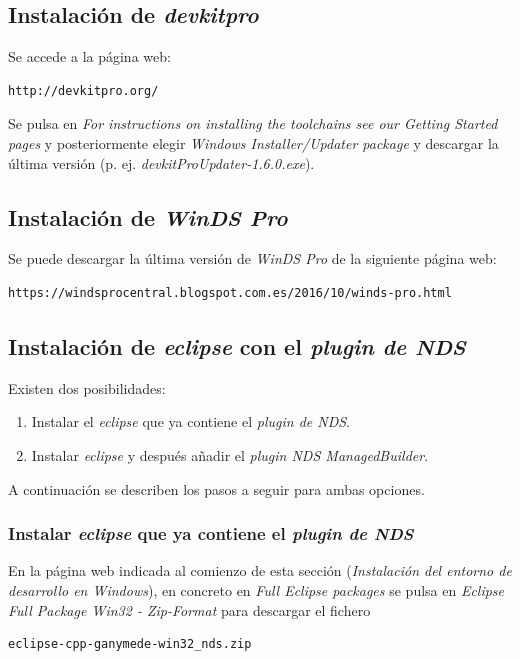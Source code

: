 \subsection{Instalación de \textit{devkitpro}}
Se accede a la página web:
\begin{verbatim}
http://devkitpro.org/
\end{verbatim}
Se pulsa en \textit{For instructions on installing the toolchains see our Getting Started pages} y posteriormente elegir \textit{Windows Installer/Updater package} y descargar la última versión (p. ej. \textit{devkitProUpdater-1.6.0.exe}). 
	
\subsection{Instalación de \textit{WinDS Pro}}
Se puede descargar la última versión de \textit{WinDS Pro} de la siguiente página web:
\begin{verbatim}
https://windsprocentral.blogspot.com.es/2016/10/winds-pro.html
\end{verbatim} 

\subsection{Instalación de \textit{eclipse} con el \textit{plugin de NDS}}
Existen dos posibilidades:
\begin{enumerate}
\item Instalar el \textit{eclipse} que ya contiene el \textit{plugin de NDS}.
\item Instalar \textit{eclipse} y después añadir el \textit{plugin NDS ManagedBuilder}.
\end{enumerate}

A continuación se describen los pasos a seguir para ambas opciones.

\subsubsection{Instalar \textit{eclipse} que ya contiene el \textit{plugin de NDS}}  
En la página web indicada al comienzo de esta sección (\textit{Instalación del entorno de desarrollo en Windows}), en concreto en \textit{Full Eclipse packages} se pulsa en \textit{Eclipse Full Package Win32 - Zip-Format} para descargar el fichero
\begin{verbatim}
eclipse-cpp-ganymede-win32_nds.zip
\end{verbatim}

